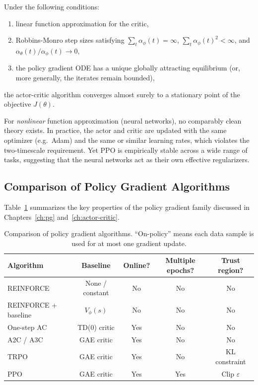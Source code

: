 \begin{theorem}
\label{thm:two-timescale}
Under the following conditions:
\begin{enumerate}[label=(\roman*), leftmargin=*]
  \item linear function approximation for the critic,
  \item Robbins-Monro step sizes satisfying
    $\sum_t \alpha_\phi(t) = \infty$, $\sum_t \alpha_\phi(t)^2 < \infty$,
    and $\alpha_\theta(t) / \alpha_\phi(t) \to 0$,
  \item the policy gradient ODE has a unique globally attracting equilibrium
    (or, more generally, the iterates remain bounded),
\end{enumerate}
the actor-critic algorithm converges almost surely to a stationary point of
the objective $J(\theta)$.
\end{theorem}

For \emph{nonlinear} function approximation (neural networks), no
comparably clean theory exists.  In practice, the actor and critic are
updated with the same optimizer (e.g.\ Adam) and the same or similar
learning rates, which violates the two-timescale requirement.  Yet PPO is
empirically stable across a wide range of tasks, suggesting that the
neural networks act as their own effective regularizers.

\subsection{Comparison of Policy Gradient Algorithms}

Table~\ref{tab:pg-comparison} summarizes the key properties of the policy
gradient family discussed in Chapters~\ref{ch:pg} and~\ref{ch:actor-critic}.

\begin{table}[ht]
\centering
\caption{Comparison of policy gradient algorithms.
``On-policy'' means each data sample is used for at most one gradient update.}
\label{tab:pg-comparison}
\begin{tabular}{@{}lcccc@{}}
\toprule
Algorithm & Baseline & Online? & Multiple epochs? & Trust region? \\
\midrule
REINFORCE               & None / constant  & No  & No  & No  \\
REINFORCE + baseline    & $V_\phi(s)$      & No  & No  & No  \\
One-step AC             & TD(0) critic     & Yes & No  & No  \\
A2C / A3C               & GAE critic       & Yes & No  & No  \\
TRPO                    & GAE critic       & Yes & No  & KL constraint \\
PPO                     & GAE critic       & Yes & Yes & Clip $\varepsilon$ \\
\bottomrule
\end{tabular}
\end{table}

